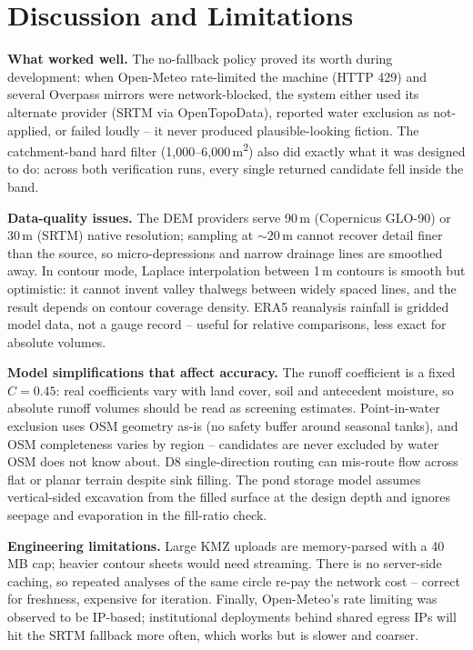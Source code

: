 \documentclass[manuscript,screen,review]{acmart}
\begin{document}
\section{Discussion and Limitations}
\label{sec:discussion}
\textbf{What worked well.} The no-fallback policy proved its worth during
development: when Open-Meteo rate-limited the machine (HTTP 429) and several
Overpass mirrors were network-blocked, the system either used its alternate
provider (SRTM via OpenTopoData), reported water exclusion as not-applied, or
failed loudly -- it never produced plausible-looking fiction. The
catchment-band hard filter (1{,}000--6{,}000\,m\textsuperscript{2}) also did
exactly what it was designed to do: across both verification runs, every
single returned candidate fell inside the band.

\textbf{Data-quality issues.} The DEM providers serve 90\,m (Copernicus
GLO-90) or 30\,m (SRTM) native resolution; sampling at ${\sim}20$\,m cannot
recover detail finer than the source, so micro-depressions and narrow
drainage lines are smoothed away. In contour mode, Laplace interpolation
between 1\,m contours is smooth but optimistic: it cannot invent valley
thalwegs between widely spaced lines, and the result depends on contour
coverage density. ERA5 reanalysis rainfall is gridded model data, not a
gauge record -- useful for relative comparisons, less exact for absolute
volumes.

\textbf{Model simplifications that affect accuracy.} The runoff coefficient
is a fixed $C = 0.45$: real coefficients vary with land cover, soil and
antecedent moisture, so absolute runoff volumes should be read as screening
estimates. Point-in-water exclusion uses OSM geometry as-is (no safety
buffer around seasonal tanks), and OSM completeness varies by region --
candidates are never excluded by water OSM does not know about. D8
single-direction routing can mis-route flow across flat or planar terrain
despite sink filling. The pond storage model assumes vertical-sided
excavation from the filled surface at the design depth and ignores seepage
and evaporation in the fill-ratio check.

\textbf{Engineering limitations.} Large KMZ uploads are memory-parsed with a
40\,MB cap; heavier contour sheets would need streaming. There is no
server-side caching, so repeated analyses of the same circle re-pay the
network cost -- correct for freshness, expensive for iteration. Finally,
Open-Meteo's rate limiting was observed to be IP-based; institutional
deployments behind shared egress IPs will hit the SRTM fallback more often,
which works but is slower and coarser.
\end{document}
